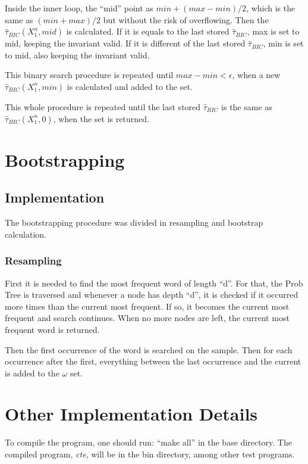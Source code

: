 \documentclass[brazil,11pt]{article}
\begin{document}
Inside the inner loop, the ``mid'' point as $min + (max - min) / 2$, which is the same as $(min + max) / 2$ but without the risk of overflowing. Then the $\hat{\tau}_{BIC}(X^n_1, mid)$ is calculated. If it is equals to the last stored $\hat{\tau}_{BIC}$, max is set to mid, keeping the invariant valid. If it is different of the last stored $\hat{\tau}_{BIC}$, min is set to mid, also keeping the invariant valid.

This binary search procedure is repeated until $max - min < \epsilon$, when a new $\hat{\tau}_{BIC}(X^n_1, min)$ is calculated and added to the set.

This whole procedure is repeated until the last stored $\hat{\tau}_{BIC}$ is the same as $\hat{\tau}_{BIC}(X^n_1,0)$, when the set is returned.

\section{Bootstrapping}

\subsection{Implementation}

The bootstrapping procedure was divided in resampling and bootstrap calculation.

\subsubsection{Resampling}

First it is needed to find the most frequent word of length ``d''. For that, the Prob Tree is traversed and whenever a node has depth ``d'', it is checked if it occurred more times than the current most frequent. If so, it becomes the current most frequent and search continues. When no more nodes are left, the current most frequent word is returned.

Then the first occurrence of the word is searched on the sample. Then for each occurrence after the first, everything between the last occurrence and the current is added to the $\omega$ set.




\section{Other Implementation Details}

To compile the program, one should run: ``make all'' in the base directory. The compiled program, \emph{cte}, will be in the bin directory, among other test programs.
\end{document}
